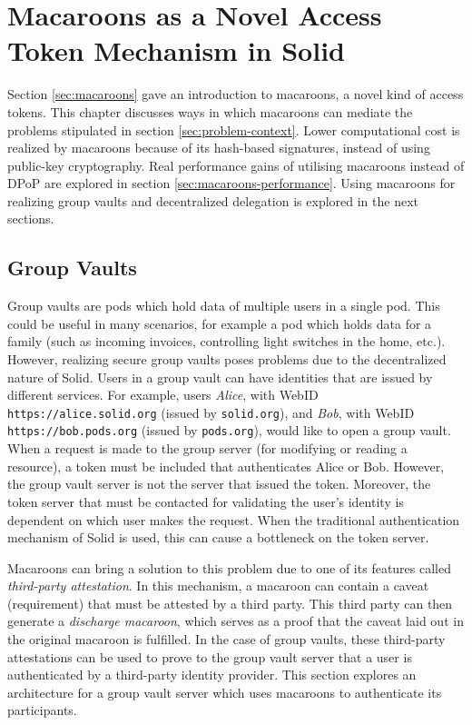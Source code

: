 \chapter{Macaroons as a Novel Access Token Mechanism in Solid}
\label{cha:decentralized-delegation}

Section \ref{sec:macaroons} gave an introduction to macaroons, a novel kind of access tokens. This chapter discusses ways in which macaroons can mediate the problems stipulated in section \ref{sec:problem-context}. Lower computational cost is realized by macaroons because of its hash-based signatures, instead of using public-key cryptography. Real performance gains of utilising macaroons instead of \gls{DPoP} are explored in section \ref{sec:macaroons-performance}. Using macaroons for realizing group vaults and decentralized delegation is explored in the next sections.

\section{Group Vaults}
\label{sec:group-vaults}
Group vaults are pods which hold data of multiple users in a single pod. This could be useful in many scenarios, for example a pod which holds data for a family (such as incoming invoices, controlling light switches in the home, etc.). However, realizing secure group vaults poses problems due to the decentralized nature of Solid. Users in a group vault can have identities that are issued by different services. For example, users \textit{Alice}, with WebID \texttt{https://alice.solid.org} (issued by \texttt{solid.org}), and \textit{Bob}, with WebID \texttt{https://bob.pods.org} (issued by \texttt{pods.org}), would like to open a group vault. When a request is made to the group server (for modifying or reading a resource), a token must be included that authenticates Alice or Bob. However, the group vault server is not the server that issued the token. Moreover, the token server that must be contacted for validating the user's identity is dependent on which user makes the request. When the traditional authentication mechanism of Solid is used, this can cause a bottleneck on the token server. 

Macaroons can bring a solution to this problem due to one of its features called \textit{third-party attestation}. In this mechanism, a macaroon can contain a caveat (requirement) that must be attested by a third party. This third party can then generate a \textit{discharge macaroon}, which serves as a proof that the caveat laid out in the original macaroon is fulfilled. In the case of group vaults, these third-party attestations can be used to prove to the group vault server that a user is authenticated by a third-party identity provider. This section explores an architecture for a group vault server which uses macaroons to authenticate its participants.

